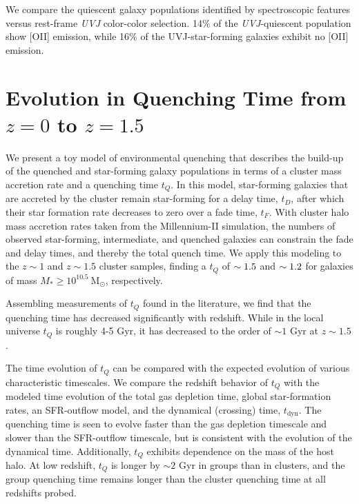 We compare the quiescent galaxy populations identified by spectroscopic features versus rest-frame \textit{UVJ} color-color selection.
14\% of the \textit{UVJ}-quiescent population show [O\textsc{II}] emission, while 16\% of the UVJ-star-forming galaxies exhibit no [O\textsc{II}] emission.

\section{Evolution in Quenching Time from $z=0$ to $z=1.5$}

We present a toy model of environmental quenching that describes the build-up of the quenched and star-forming galaxy populations in terms of a cluster mass accretion rate and a quenching time $t_Q$.
In this model, star-forming galaxies that are accreted by the cluster remain star-forming for a delay time, $t_D$, after which their star formation rate decreases to zero over a fade time, $t_F$.
With cluster halo mass accretion rates taken from the Millennium-\textsc{II} simulation, the numbers of observed star-forming, intermediate, and quenched galaxies can constrain the fade and delay times, and thereby the total quench time.
We apply this modeling to the $z\sim1$ and $z\sim1.5$ cluster samples, finding a $t_Q$ of $\sim1.5$ and $\sim1.2$ for galaxies of mass $M_* \geq 10^{10.5}~\mathrm{M}_\odot$, respectively.

Assembling measurements of $t_Q$ found in the literature, we find that the quenching time has decreased significantly with redshift.
While in the local universe $t_Q$ is roughly 4-5 Gyr, it has decreased to the order of $\sim1$ Gyr at $z\sim1.5$.

The time evolution of $t_Q$ can be compared with the expected evolution of various characteristic timescales.
We compare the redshift behavior of $t_Q$ with the modeled time evolution of the total gas depletion time, global star-formation rates, an SFR-outflow model, and the dynamical (crossing) time, $t_\mathrm{dyn}$.
The quenching time is seen to evolve faster than the gas depletion timescale and slower than the SFR-outflow timescale, but is consistent with the evolution of the dynamical time.
Additionally, $t_Q$ exhibits dependence on the mass of the host halo.
At low redshift, $t_Q$ is longer by $\sim2$ Gyr in groups than in clusters, and the group quenching time remains longer than the cluster quenching time at all redshifts probed.

